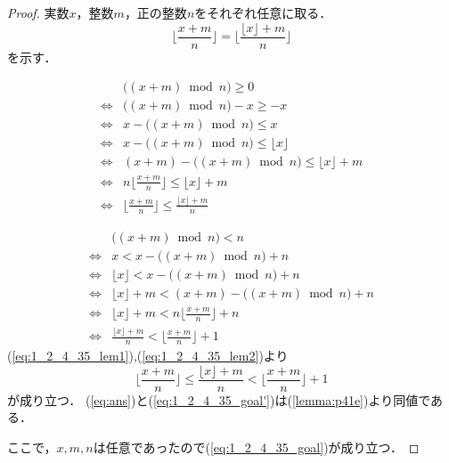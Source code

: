 \documentclass[11pt,dvipdfmx]{jarticle}
\theoremstyle{definition}
\begin{document}
\begin{proof}
実数$x$，整数$m$，正の整数$n$をそれぞれ任意に取る．
\begin{equation}
\lfloor \frac{x+m}{n} \rfloor =  \lfloor \frac{ \lfloor x \rfloor +m}{n} \rfloor
 \label{eq:1_2_4_35_goal'}
\end{equation}
を示す．

\begin{equation}
 \begin{split}
   & \bigl( (x+m) \bmod n \bigr) \geq 0 \\
 \iff  & \bigl( (x+m) \bmod n \bigr) -x \geq -x \\
 \iff  & x - \bigl( (x+m) \bmod n \bigr) \leq x \\
 \iff  & x - \bigl( (x+m) \bmod n \bigr) \leq \lfloor x \rfloor \\
 \iff  & (x+m) - \bigl( (x+m) \bmod n \bigr) \leq \lfloor x \rfloor + m \\
 \iff  & n \lfloor \frac{x+m}{n} \rfloor \leq \lfloor x \rfloor + m \\
 \iff  & \lfloor \frac{x+m}{n} \rfloor \leq \frac{\lfloor x \rfloor + m}{n}
 \end{split}
 \label{eq:1_2_4_35_lem1}
\end{equation}

\begin{equation}
 \begin{split}
   & \bigl( (x+m) \bmod n \bigr) < n \\
 \iff  & x < x - \bigl( (x+m) \bmod n \bigr) + n \\
 \iff  & \lfloor x \rfloor < x - \bigl( (x+m) \bmod n \bigr) + n \\
 \iff  & \lfloor x \rfloor + m < (x+m) - \bigl( (x+m) \bmod n \bigr) + n \\
 \iff  & \lfloor x \rfloor + m < n\lfloor \frac{x+m}{n} \rfloor + n \\
 \iff  & \frac{\lfloor x \rfloor + m}{n} < \lfloor \frac{x+m}{n} \rfloor + 1
 \label{eq:1_2_4_35_lem2}
 \end{split}
\end{equation}
(\ref{eq:1_2_4_35_lem1}),(\ref{eq:1_2_4_35_lem2})より
\begin{equation}
\lfloor \frac{x+m}{n} \rfloor \leq \frac{\lfloor x \rfloor + m}{n} < \lfloor \frac{x+m}{n} \rfloor + 1
 \label{eq:ans}
\end{equation}
が成り立つ．
(\ref{eq:ans})と(\ref{eq:1_2_4_35_goal'})は(\ref{lemma:p41e})より同値である．\par
\noindent ここで，$x,m,n$は任意であったので(\ref{eq:1_2_4_35_goal})が成り立つ．
\end{proof}
\end{document}
